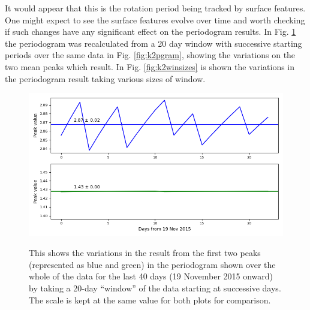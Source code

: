 It would appear that this is the rotation period being tracked by surface
features. One might expect to see the surface features evolve over time and
worth checking if such changes have any significant effect on the periodogram
results. In Fig. \ref{fig:win20day} the periodogram was recalculated from a
20 day window with successive starting periods over the same data in Fig.
\ref{fig:k2pgram}, showing the variations on the two mean peaks which result.
In Fig. \ref{fig:k2winsizes} is shown the variations in the periodogram result
taking various sizes of window.

\begin{figure}[!htbp]
\begin{center}
\includegraphics[scale=0.40]{k2/images/period_track.png} \\
\vspace{-.5cm}
\end{center}   
\caption{This shows the variations in the result from the first two peaks
(represented as blue and green) in the periodogram shown over the whole of the
data for the last 40 days (19 November 2015 onward) by taking a 20-day
``window'' of the data starting at successive days.
The scale is kept at the same value for both plots
for comparison.}\protect\label{fig:win20day}
\end{figure}

